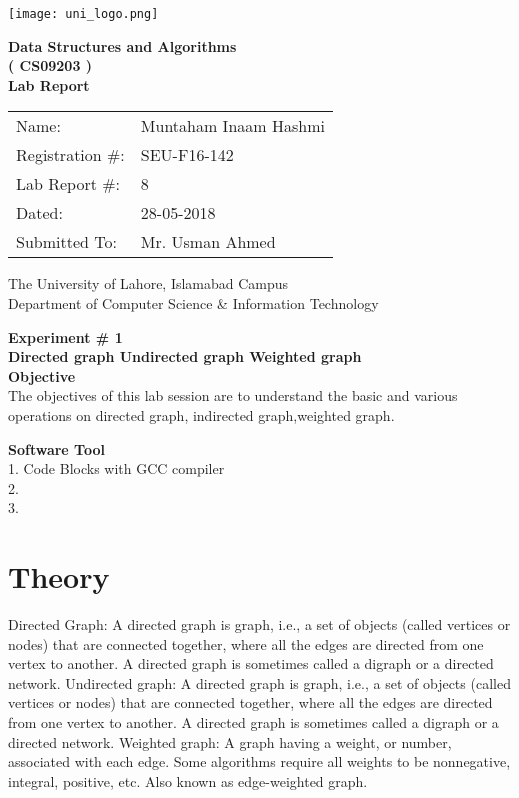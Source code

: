 \documentclass[11pt]{article}            %
\begin{document}
\begin{titlepage}
    \centering
  \vfill
    \texttt{[image: uni\_logo.png]} \\ 
	\vskip2cm
    {\bfseries\Large
	Data Structures and Algorithms \\ ( CS09203 )\\
	
	\vskip2cm
	Lab Report 
	 
	\vskip2cm
	}    

\begin{center}
\begin{tabular}{ l l  } 

Name: & Muntaham Inaam Hashmi  \\ 
Registration \#: & SEU-F16-142 \\ 
Lab Report \#: & 8 \\ 
 Dated:& 28-05-2018\\ 
Submitted To:& Mr. Usman Ahmed\\ 

\end{tabular}
\end{center}
    \vfill
    The University of Lahore, Islamabad Campus\\
Department of Computer Science \& Information Technology
\end{titlepage}


    
    {\bfseries\Large
\centering
	Experiment \# 1 \\

Directed graph
Undirected graph
Weighted graph\\
	
	}    
 \vskip1cm
 \textbf {Objective}\\ The objectives of this lab session are to understand the basic and various operations on directed graph, indirected graph,weighted graph. 
 
 \textbf {Software Tool}\\
1. Code Blocks with GCC compiler\\
2. \\
3. \\

\section{Theory }             Directed Graph:
A directed graph is graph, i.e., a set of objects (called vertices or nodes) that are connected together, where all the edges are directed from one vertex to another. A directed graph is sometimes called a digraph or a directed network.
Undirected graph:
A directed graph is graph, i.e., a set of objects (called vertices or nodes) that are connected together, where all the edges are directed from one vertex to another. A directed graph is sometimes called a digraph or a directed network.
Weighted graph:
 A graph having a weight, or number, associated with each edge. Some algorithms require all weights to be nonnegative, integral, positive, etc. Also known as edge-weighted graph.
\end{document}
